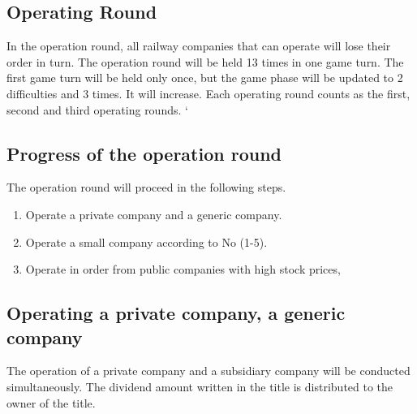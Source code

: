 \documentclass{article}
\begin{document}
\begin{CJK}{UTF8}{min}

\section{Operating Round}
In the operation round, all railway companies that can operate will
lose their order in turn. The operation round will be held 13 times in
one game turn. The first game turn will be held only once, but the
game phase will be updated to 2 difficulties and 3 times. It will
increase. Each operating round counts as the first, second and third
operating rounds. `

\subsection{Progress of the operation round}
The operation round will proceed in the following steps.
\begin{enumerate}
\item Operate a private company and a generic company.
\item Operate a small company according to No (1-5).
\item Operate in order from public companies with high stock prices,
\end{enumerate}

\subsection{Operating a private company, a generic company}
The operation of a private company and a subsidiary company will be
conducted simultaneously. The dividend amount written in the title is
distributed to the owner of the title.


\end{CJK}
\end{document}
